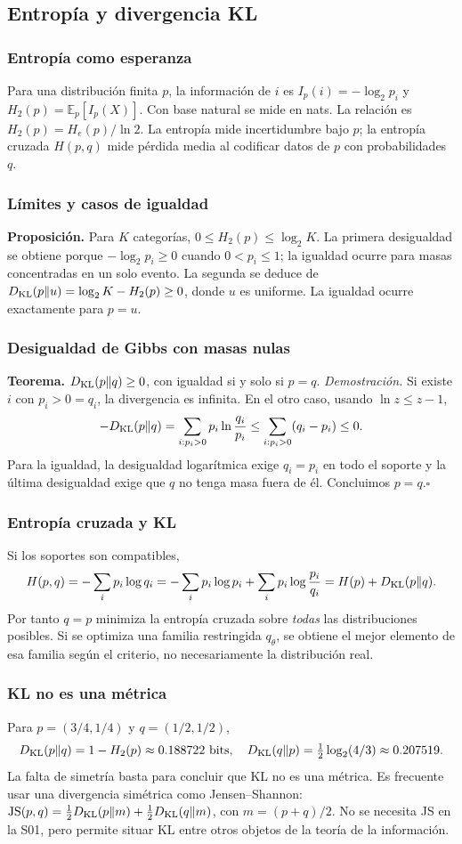 \subsection{Entropía y divergencia KL}
\subsubsection{Entropía como esperanza}
Para una distribución finita $p$, la información de $i$ es
$I_p(i)=-\log_2p_i$ y $H_2(p)=\mathbb E_p[I_p(X)]$.
Con base natural se mide en nats. La relación es
$H_2(p)=H_e(p)/\ln2$. La entropía mide incertidumbre bajo $p$;
la entropía cruzada $H(p,q)$ mide pérdida media al codificar datos de $p$
con probabilidades $q$.
\subsubsection{Límites y casos de igualdad}
\textbf{Proposición.} Para $K$ categorías,
$0\le H_2(p)\le\log_2K$. La primera desigualdad se obtiene porque
$-\log_2p_i\ge0$ cuando $0<p_i\le1$; la igualdad ocurre para masas
concentradas en un solo evento. La segunda se deduce de
$D_{\rm KL}(p\|u)=\log_2K-H_2(p)\ge0$, donde $u$ es uniforme.
La igualdad ocurre exactamente para $p=u$.
\subsubsection{Desigualdad de Gibbs con masas nulas}
\textbf{Teorema.} $D_{\rm KL}(p\|q)\ge0$, con igualdad si y solo si $p=q$.
\textit{Demostración.} Si existe $i$ con $p_i>0=q_i$, la divergencia es
infinita. En el otro caso, usando $\ln z\le z-1$,
\[
-D_{\rm KL}(p\|q)=\sum_{i:p_i>0}p_i\ln\frac{q_i}{p_i}
\le\sum_{i:p_i>0}(q_i-p_i)\le0.
\]
Para la igualdad, la desigualdad logarítmica exige $q_i=p_i$ en todo el
soporte y la última desigualdad exige que $q$ no tenga masa fuera de él.
Concluimos $p=q$.\hfill$\square$
\subsubsection{Entropía cruzada y KL}
Si los soportes son compatibles,
\[
H(p,q)=-\sum_ip_i\log q_i
=-\sum_ip_i\log p_i+\sum_ip_i\log\frac{p_i}{q_i}
=H(p)+D_{\rm KL}(p\|q).
\]
Por tanto $q=p$ minimiza la entropía cruzada sobre \emph{todas} las
distribuciones posibles. Si se optimiza una familia restringida $q_\theta$,
se obtiene el mejor elemento de esa familia según el criterio, no
necesariamente la distribución real.
\subsubsection{KL no es una métrica}
Para $p=(3/4,1/4)$ y $q=(1/2,1/2)$,
\[
D_{\rm KL}(p\|q)=1-H_2(p)\approx0.188722\text{ bits},
\quad D_{\rm KL}(q\|p)=\tfrac12\log_2(4/3)\approx0.207519.
\]
La falta de simetría basta para concluir que KL no es una métrica.
Es frecuente usar una divergencia simétrica como Jensen--Shannon:
$\mathrm{JS}(p,q)=\tfrac12D_{\rm KL}(p\|m)+\tfrac12D_{\rm KL}(q\|m)$,
con $m=(p+q)/2$. No se necesita JS en la S01, pero permite situar KL
entre otros objetos de la teoría de la información.
